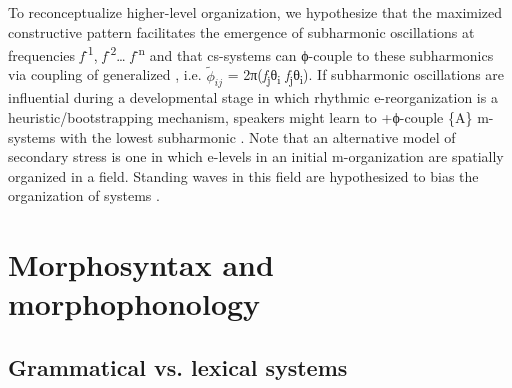   To reconceptualize higher-level  organization, we hypothesize that the maximized constructive  pattern facilitates the emergence of subharmonic oscillations at frequencies \textit{f}\textsuperscript{{}-1}, \textit{f}\textsuperscript{{}-2}… \textit{f}\textsuperscript{{}-n} and that cs-systems can ϕ-couple to these subharmonics via coupling of generalized , i.e. $\tilde{\phi}_{ij}$ = 2π(\textit{f}\textsubscript{j}θ\textsubscript{i} \textminus{} \textit{f}\textsubscript{j}θ\textsubscript{i}). If subharmonic oscillations are influential during a developmental stage in which rhythmic e-reorganization is a heuristic/bootstrapping mechanism, speakers might learn to +ϕ-couple \{A\} m-sys\-tems with the lowest subharmonic . Note that an alternative model of secondary stress is one in which e-levels in an initial m-organization are spatially organized in a field. Standing waves in this field are hypothesized to bias the organization of  systems \citep{Tilsen2018b}.

\section{Morphosyntax and morphophonology}
\rohead{\headmark}
\subsection{Grammatical vs. lexical systems}

